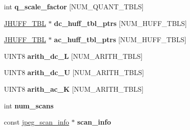 \begin{DoxyCompactItemize}
\item 
\hypertarget{structjpeg__compress__struct_a0fee6bbbc998cfa543e77aad28f47911}{int {\bfseries q\-\_\-scale\-\_\-factor} \mbox{[}N\-U\-M\-\_\-\-Q\-U\-A\-N\-T\-\_\-\-T\-B\-L\-S\mbox{]}}\label{structjpeg__compress__struct_a0fee6bbbc998cfa543e77aad28f47911}

\item 
\hypertarget{structjpeg__compress__struct_a32ccb497e8198386c473d43223585ae5}{\hyperlink{structJHUFF__TBL}{J\-H\-U\-F\-F\-\_\-\-T\-B\-L} $\ast$ {\bfseries dc\-\_\-huff\-\_\-tbl\-\_\-ptrs} \mbox{[}N\-U\-M\-\_\-\-H\-U\-F\-F\-\_\-\-T\-B\-L\-S\mbox{]}}\label{structjpeg__compress__struct_a32ccb497e8198386c473d43223585ae5}

\item 
\hypertarget{structjpeg__compress__struct_ae4b1e3f753fe2e80c3e4d8d8c5dcd9db}{\hyperlink{structJHUFF__TBL}{J\-H\-U\-F\-F\-\_\-\-T\-B\-L} $\ast$ {\bfseries ac\-\_\-huff\-\_\-tbl\-\_\-ptrs} \mbox{[}N\-U\-M\-\_\-\-H\-U\-F\-F\-\_\-\-T\-B\-L\-S\mbox{]}}\label{structjpeg__compress__struct_ae4b1e3f753fe2e80c3e4d8d8c5dcd9db}

\item 
\hypertarget{structjpeg__compress__struct_abcd6601461f6531a1b8f1e011772722d}{U\-I\-N\-T8 {\bfseries arith\-\_\-dc\-\_\-\-L} \mbox{[}N\-U\-M\-\_\-\-A\-R\-I\-T\-H\-\_\-\-T\-B\-L\-S\mbox{]}}\label{structjpeg__compress__struct_abcd6601461f6531a1b8f1e011772722d}

\item 
\hypertarget{structjpeg__compress__struct_ad760a336abaa98563938ffe076eb54f7}{U\-I\-N\-T8 {\bfseries arith\-\_\-dc\-\_\-\-U} \mbox{[}N\-U\-M\-\_\-\-A\-R\-I\-T\-H\-\_\-\-T\-B\-L\-S\mbox{]}}\label{structjpeg__compress__struct_ad760a336abaa98563938ffe076eb54f7}

\item 
\hypertarget{structjpeg__compress__struct_a6b96f1e8cf5e553b4485c92cc4360d42}{U\-I\-N\-T8 {\bfseries arith\-\_\-ac\-\_\-\-K} \mbox{[}N\-U\-M\-\_\-\-A\-R\-I\-T\-H\-\_\-\-T\-B\-L\-S\mbox{]}}\label{structjpeg__compress__struct_a6b96f1e8cf5e553b4485c92cc4360d42}

\item 
\hypertarget{structjpeg__compress__struct_abf2f96c340659a09a9ce08469a17e08b}{int {\bfseries num\-\_\-scans}}\label{structjpeg__compress__struct_abf2f96c340659a09a9ce08469a17e08b}

\item 
\hypertarget{structjpeg__compress__struct_a58a76d81ea3f48502c765880c50facdf}{const \hyperlink{structjpeg__scan__info}{jpeg\-\_\-scan\-\_\-info} $\ast$ {\bfseries scan\-\_\-info}}\label{structjpeg__compress__struct_a58a76d81ea3f48502c765880c50facdf}


\end{DoxyCompactItemize}
